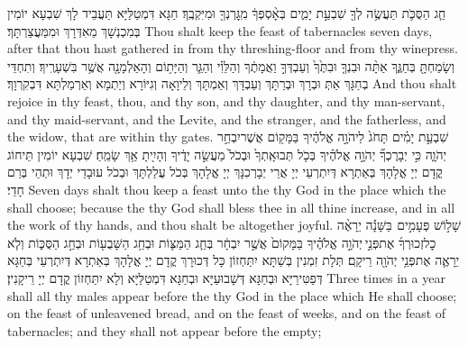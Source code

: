 {חַ֧ג הַסֻּכֹּ֛ת תַּעֲשֶׂ֥ה לְךָ֖ שִׁבְעַ֣ת יָמִ֑ים בְּאׇ֨סְפְּךָ֔ מִֽגׇּרְנְךָ֖ וּמִיִּקְבֶֽךָ׃}
{חַגָּא דִּמְטַלַּיָּא תַּעֲבֵיד לָךְ שִׁבְעָא יוֹמִין בְּמִכְנְשָׁךְ מֵאִדְּרָךְ וּמִמַּעֲצַרְתָּךְ׃}
{Thou shalt keep the feast of tabernacles seven days, after that thou hast gathered in from thy threshing-floor and from thy winepress.}{}
{וְשָׂמַחְתָּ֖ בְּחַגֶּ֑ךָ אַתָּ֨ה וּבִנְךָ֤ וּבִתֶּ֙ךָ֙ וְעַבְדְּךָ֣ וַאֲמָתֶ֔ךָ וְהַלֵּוִ֗י וְהַגֵּ֛ר וְהַיָּת֥וֹם וְהָאַלְמָנָ֖ה אֲשֶׁ֥ר בִּשְׁעָרֶֽיךָ׃}
{וְתִחְדֵּי בְחַגָּךְ אַתְּ וּבְרָךְ וּבְרַתָּךְ וְעַבְדָּךְ וְאַמְתָּךְ וְלֵיוָאָה וְגִיּוֹרָא וְיַתְמָא וְאַרְמַלְתָּא דִּבְקִרְוָךְ׃}
{And thou shalt rejoice in thy feast, thou, and thy son, and thy daughter, and thy man-servant, and thy maid-servant, and the Levite, and the stranger, and the fatherless, and the widow, that are within thy gates.}{}
{שִׁבְעַ֣ת יָמִ֗ים תָּחֹג֙ לַיהֹוָ֣ה אֱלֹהֶ֔יךָ בַּמָּק֖וֹם אֲשֶׁר\maqqaf יִבְחַ֣ר יְהֹוָ֑ה כִּ֣י יְבָרֶכְךָ֞ יְהֹוָ֣ה אֱלֹהֶ֗יךָ בְּכֹ֤ל תְּבוּאָֽתְךָ֙ וּבְכֹל֙ מַעֲשֵׂ֣ה יָדֶ֔יךָ וְהָיִ֖יתָ אַ֥ךְ שָׂמֵֽחַ׃}
{שִׁבְעָא יוֹמִין תֵּיחוֹג קֳדָם יְיָ אֱלָהָךְ בְּאַתְרָא דְּיִתְרְעֵי יְיָ אֲרֵי יְבָרְכִנָּךְ יְיָ אֱלָהָךְ בְּכֹל עֲלַלְתָּךְ וּבְכֹל עוּבָדֵי יְדָךְ וּתְהֵי בְּרַם חָדֵי׃}
{Seven days shalt thou keep a feast unto the \lord\space thy God in the place which the \lord\space shall choose; because the \lord\space thy God shall bless thee in all thine increase, and in all the work of thy hands, and thou shalt be altogether joyful.}{}
{שָׁל֣וֹשׁ פְּעָמִ֣ים \pasek  בַּשָּׁנָ֡ה יֵרָאֶ֨ה כׇל\maqqaf זְכוּרְךָ֜ אֶת\maqqaf פְּנֵ֣י \legarmeh  יְהֹוָ֣ה אֱלֹהֶ֗יךָ בַּמָּקוֹם֙ אֲשֶׁ֣ר יִבְחָ֔ר בְּחַ֧ג הַמַּצּ֛וֹת וּבְחַ֥ג הַשָּׁבֻע֖וֹת וּבְחַ֣ג הַסֻּכּ֑וֹת וְלֹ֧א יֵרָאֶ֛ה אֶת\maqqaf פְּנֵ֥י יְהֹוָ֖ה רֵיקָֽם׃}
{תְּלָת זִמְנִין בְּשַׁתָּא יִתַּחְזוֹן כָּל דְּכוּרָךְ קֳדָם יְיָ אֱלָהָךְ בְּאַתְרָא דְּיִתְרְעֵי בְּחַגָּא דְּפַטִּירַיָּא וּבְחַגָּא דְּשָׁבוּעַיָּא וּבְחַגָּא דִּמְטַלַּיָּא וְלָא יִתַּחְזוֹן קֳדָם יְיָ רֵיקָנִין׃}
{Three times in a year shall all thy males appear before the \lord\space thy God in the place which He shall choose; on the feast of unleavened bread, and on the feast of weeks, and on the feast of tabernacles; and they shall not appear before the \lord\space empty;}{}

